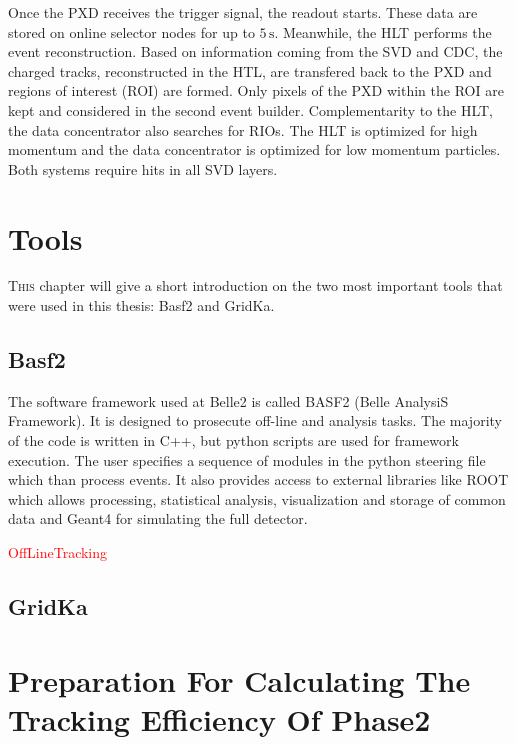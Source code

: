 \documentclass[a4paper,11pt,twosided,final,german,openbib,pdftex,listof=totoc,bibliography=totoc]{scrbook}
\begin{document}
Once the PXD receives the trigger signal, the readout starts. These data are stored on online selector nodes for up to $5\,\textrm{s}$. Meanwhile, the HLT performs the event reconstruction. Based on information coming from the SVD and CDC, the charged tracks, reconstructed in the HTL, are transfered back to the PXD and regions of interest (ROI) are formed. Only pixels of the PXD within the ROI are kept and considered in the second event builder. Complementarity to the HLT, the data concentrator also searches for RIOs. The HLT is optimized for high momentum and the data concentrator is optimized for low momentum particles. Both systems require hits in all SVD layers. 





\chapter{Tools}
\label{sec:Tools}

\lettrine{T}{his} chapter will give a short introduction on the two most important tools that were used in this thesis: Basf2 and GridKa.


\section{Basf2}

The software framework used at Belle2 is called BASF2 (Belle AnalysiS Framework). It is designed to prosecute off-line and analysis tasks. The majority of the code is written in C++, but python scripts are used for framework execution. The user specifies a sequence of modules in the python steering file which than process events. It also provides access to external libraries like ROOT which allows processing, statistical analysis, visualization and storage of common data and Geant4 for simulating the full detector.\cite{Moll_2011}











\textcolor{red}{OffLineTracking}
\section{GridKa}






\chapter{Preparation  For Calculating The Tracking Efficiency Of Phase2}
\label{chap:Phase2Eff}
\end{document}
